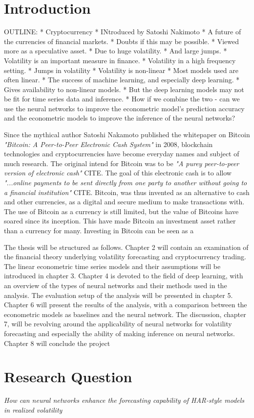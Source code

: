 \chapter{Introduction}
\label{sec:org06668a7}
OUTLINE:
    * Cryptocurrency
    * INtroduced by Satoshi Nakimoto
    * A future of the currencies of financial markets. 
    * Doubts if this may be possible.
    * Viewed more as a speculative asset.
    * Due to huge volatility.
    * And large jumps.
    * Volatility is an important measure in finance.
    * Volatility in a high frequency setting.
    * Jumps in volatility 
    * Volatility is non-linear
    * Most models used are often linear.
    * The success of machine learning, and especially deep learning.
    * Gives availability to non-linear models.
    * But the deep learning models may not be fit for time series data and inference.
    * How if we combine the two - can we use the neural networks to improve the econometric model's prediction accuracy and the econometric models to improve the inference of the neural networks?

Since the mythical author Satoshi Nakamoto published the whitepaper on Bitcoin \textit{"Bitcoin: A Peer-to-Peer Electronic Cash System"} in 2008, blockchain technologies and cryptocurrencies have become everyday names and subject of much research.
The original intend for Bitcoin was to be \textit{"A purey peer-to-peer version of electronic cash"} CITE.
The goal of this electronic cash is to allow \textit{"...online payments to be sent directly from one party to another without going to a financial institution"} CITE.
Bitcoin, was thus invented as an alternative to cash and other currencies, as a digital and secure medium to make transactions with.
The use of Bitcoin as a currency is still limited, but the value of Bitcoins have soared since its inception.
This have made Bitcoin an investment asset rather than a currency for many.
Investing in Bitcoin can be seen as a 




The thesis will be structured as follows.
Chapter 2 will contain an examination of the financial theory underlying volatility forecasting and cryptocurrency trading.
The linear econometric time series models and their assumptions will be introduced in chapter 3.
Chapter 4 is devoted to the field of deep learning, with an overview of the types of neural networks and their methods used in the analysis.
The evaluation setup of the analysis will be presented in chapter 5.
Chapter 6 will present the results of the analysis, with a comparison between the econometric models as baselines and the neural network.
The discussion, chapter 7, will be revolving around the applicability of neural networks for volatility forecasting and especially the ability of making inference on neural networks.
Chapter 8 will conclude the project

\chapter{Research Question}
\label{sec:org6232157}
\emph{How can neural networks enhance the forecasting capability of HAR-style models in realized volatility}

